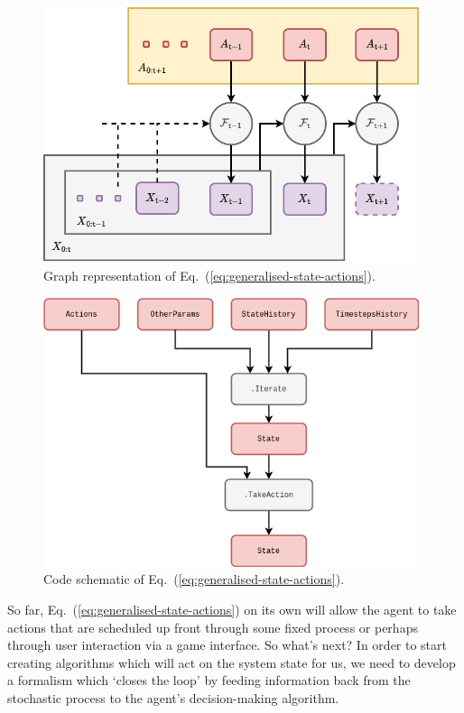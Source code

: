 \begin{figure}[h]
\centering
\includegraphics[width=11cm]{images/chapter-9-fundamental-loop-with-actions.drawio.png}
\caption{Graph representation of Eq.~(\ref{eq:generalised-state-actions}).}
\label{fig:fundamental-loop-with-actions}
\end{figure}

\begin{figure}[h]
\centering
\includegraphics[width=11cm]{images/chapter-9-iterations-with-actions.drawio.png}
\caption{Code schematic of Eq.~(\ref{eq:generalised-state-actions}).}
\label{fig:iterations-with-actions}
\end{figure}

So far, Eq.~(\ref{eq:generalised-state-actions}) on its own will allow the agent to take actions that are scheduled up front through some fixed process or perhaps through user interaction via a game interface. So what's next? In order to start creating algorithms which will act on the system state for us, we need to develop a formalism which `closes the loop' by feeding information back from the stochastic process to the agent's decision-making algorithm.

